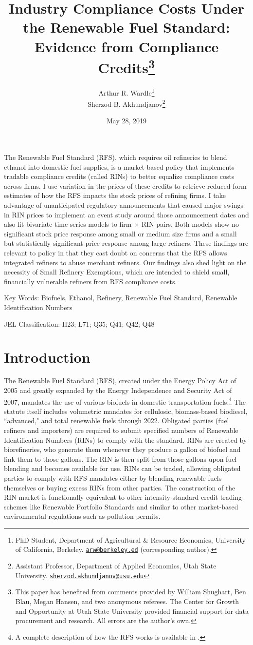 \documentclass[11pt]{article}
\title{{\Large \bf Industry Compliance Costs Under the Renewable Fuel Standard: Evidence from Compliance Credits\thanks{This paper has benefited from comments provided by William Shughart, Ben Blau, Megan Hansen, and two anonymous referees. The Center for Growth and Opportunity at Utah State University provided financial support for data procurement and research. All errors are the author's own.}}}
\author{Arthur R. Wardle\footnote{
PhD Student, Department of Agricultural \& Resource Economics, University of California, Berkeley. \href{mailto:arw@berkeley.edu}{\tt arw@berkeley.ed} (corresponding author).}\\
Sherzod B. Akhundjanov\footnote{Assistant Professor, Department of Applied Economics, Utah State University. \href{matilto:sherzod.akhundjanov@usu.edu}{\tt sherzod.akhundjanov@usu.edu}}}
\date{May 28, 2019}
\begin{document}
\maketitle

The Renewable Fuel Standard (RFS), which requires oil refineries to blend ethanol into domestic fuel supplies, is a market-based policy that implements tradable compliance credits (called RINs) to better equalize compliance costs across firms. I use variation in the prices of these credits to retrieve reduced-form estimates of how the RFS impacts the stock prices of refining firms. I take advantage of unanticipated regulatory announcements that caused major swings in RIN prices to implement an event study around those announcement dates and also fit bivariate time series models to firm $\times$ RIN pairs. Both models show no significant stock price response among small or medium size firms and a small but statistically significant price response among large refiners. These findings are relevant to policy in that they cast doubt on concerns that the RFS allows integrated refiners to abuse merchant refiners. Our findings also shed light on the necessity of Small Refinery Exemptions, which are intended to shield small, financially vulnerable refiners from RFS compliance costs.
\newline

{\small
Key Words: Biofuels, Ethanol, Refinery, Renewable Fuel Standard, Renewable Identification Numbers

JEL Classification: H23; L71; Q35; Q41; Q42; Q48}
\newpage

\section{Introduction}

The Renewable Fuel Standard (RFS), created under the Energy Policy Act of 2005 and greatly expanded by the Energy Independence and Security Act of 2007, mandates the use of various biofuels in domestic transportation fuels.\footnote{A complete description of how the RFS works is available in \cite{Schnepf2013}.} The statute itself includes volumetric mandates for cellulosic, biomass-based biodiesel, ``advanced," and total renewable fuels through 2022. Obligated parties (fuel refiners and importers) are required to submit specified numbers of Renewable Identification Numbers (RINs) to comply with the standard. RINs are created by biorefineries, who generate them whenever they produce a gallon of biofuel and link them to those gallons. The RIN is then split from those gallons upon fuel blending and becomes available for use. RINs can be traded, allowing obligated parties to comply with RFS mandates either by blending renewable fuels themselves or buying excess RINs from other parties. The construction of the RIN market is functionally equivalent to other intensity standard credit trading schemes like Renewable Portfolio Standards and similar to other market-based environmental regulations such as pollution permits. 
\end{document}
